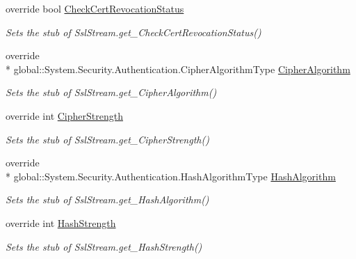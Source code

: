 \begin{DoxyCompactItemize}
override bool \hyperlink{class_system_1_1_net_1_1_security_1_1_fakes_1_1_stub_ssl_stream_a10f9ceed5f7d75027cd3f58ff0870745}{Check\-Cert\-Revocation\-Status}
\begin{DoxyCompactList}\small\item\em Sets the stub of Ssl\-Stream.\-get\-\_\-\-Check\-Cert\-Revocation\-Status()\end{DoxyCompactList}\item 
override \\*
global\-::\-System.\-Security.\-Authentication.\-Cipher\-Algorithm\-Type \hyperlink{class_system_1_1_net_1_1_security_1_1_fakes_1_1_stub_ssl_stream_a2ee832ed85234bbbce3189b85fe5ca11}{Cipher\-Algorithm}
\begin{DoxyCompactList}\small\item\em Sets the stub of Ssl\-Stream.\-get\-\_\-\-Cipher\-Algorithm()\end{DoxyCompactList}\item 
override int \hyperlink{class_system_1_1_net_1_1_security_1_1_fakes_1_1_stub_ssl_stream_af8cfdee83c3bbe81c17ba9cc01faa63b}{Cipher\-Strength}
\begin{DoxyCompactList}\small\item\em Sets the stub of Ssl\-Stream.\-get\-\_\-\-Cipher\-Strength()\end{DoxyCompactList}\item 
override \\*
global\-::\-System.\-Security.\-Authentication.\-Hash\-Algorithm\-Type \hyperlink{class_system_1_1_net_1_1_security_1_1_fakes_1_1_stub_ssl_stream_a4e53b31642c08ad4eafe73ea01d7834c}{Hash\-Algorithm}
\begin{DoxyCompactList}\small\item\em Sets the stub of Ssl\-Stream.\-get\-\_\-\-Hash\-Algorithm()\end{DoxyCompactList}\item 
override int \hyperlink{class_system_1_1_net_1_1_security_1_1_fakes_1_1_stub_ssl_stream_a669a7a9d4816bb75a468da83e294d84c}{Hash\-Strength}
\begin{DoxyCompactList}\small\item\em Sets the stub of Ssl\-Stream.\-get\-\_\-\-Hash\-Strength()\end{DoxyCompactList}\item 

\end{DoxyCompactItemize}
